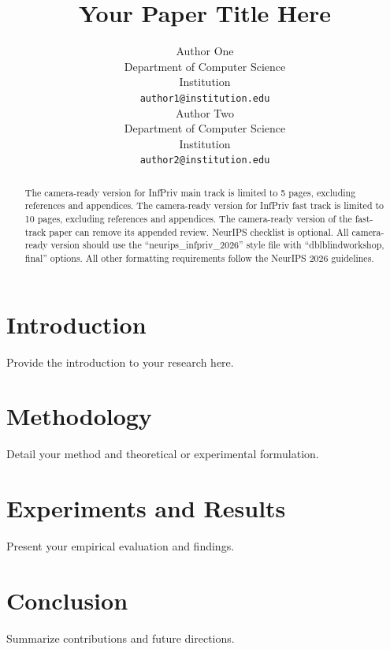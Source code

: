 \documentclass{article}
\title{Your Paper Title Here}
\author{%
  Author One \\
  Department of Computer Science \\
  Institution \\
  \texttt{author1@institution.edu} \\
  \And
  Author Two \\
  Department of Computer Science \\
  Institution \\
  \texttt{author2@institution.edu} \\
}
\begin{document}
\maketitle

\begin{abstract}
The camera-ready version for InfPriv main track is limited to 5 pages, excluding references and appendices. The camera-ready version for InfPriv fast track is limited to 10 pages, excluding references and appendices. The camera-ready version of the fast-track paper can remove its appended review. NeurIPS checklist is optional. All camera-ready version should use the ``neurips\_infpriv\_2026'' style file with ``dblblindworkshop, final'' options. All other formatting requirements follow the NeurIPS 2026 guidelines.
\end{abstract}

\section{Introduction}
Provide the introduction to your research here.

\section{Methodology}
Detail your method and theoretical or experimental formulation.

\section{Experiments and Results}
Present your empirical evaluation and findings.

\section{Conclusion}
Summarize contributions and future directions.


% 
\end{document}

